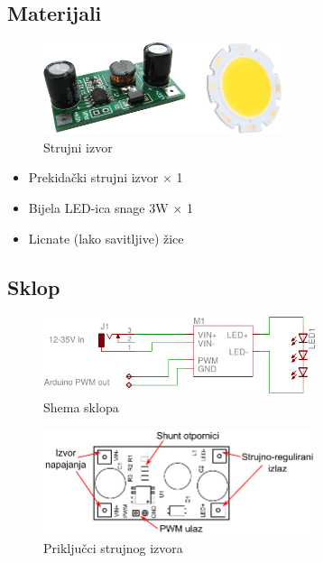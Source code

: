 \documentclass[times, utf8, zavrsni, numeric, sort]{fer}
\begin{document}
\subsection{Materijali}

\begin{figure}[h!]
	\centering
	\includegraphics[width=7cm]{./Fotke/1W LED/Materijal.jpg}
	\caption{Strujni izvor}
	\label{fig:slika1}
\end{figure}

\begin{itemize}
	\setlength{\itemsep}{0pt}
	\setlength{\parskip}{0pt}
	
	\item Prekidački strujni izvor $\times$ 1
	\item Bijela LED-ica snage 3W $\times$ 1
	\item Licnate (lako savitljive) žice
\end{itemize}

\subsection{Sklop}

\begin{figure}[htb]
	\centering
	\includegraphics[width=8cm]{./Sklopovi/1W LED/sklop.pdf}
	\caption{Shema sklopa}
	\label{fig:ledshema}
\end{figure}

\begin{figure}[htb]
	\centering
	\includegraphics[width=8cm]{./Sklopovi/1W LED/pinout.pdf}
	\caption{Priključci strujnog izvora}
	\label{fig:leddriverpinout}
\end{figure}
\end{document}
